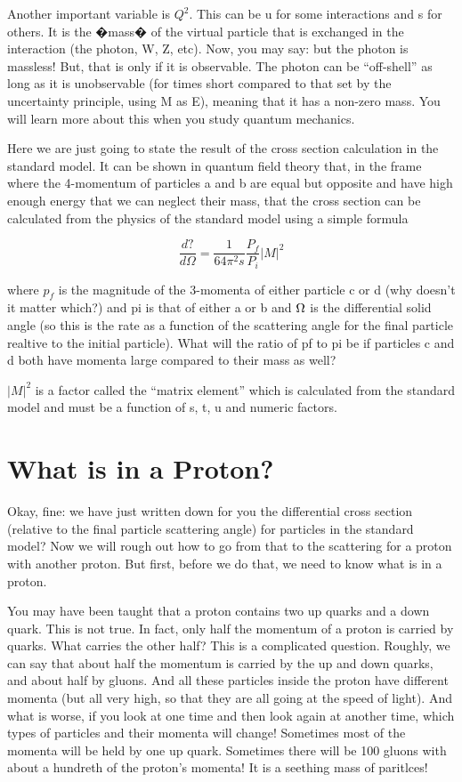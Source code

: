 Another important variable is \(Q^{2}\).  This can be u for some interactions and s for others.  It is the �mass� of the virtual particle that is exchanged in the interaction (the photon, W, Z, etc).  
Now, you may say: but the photon is massless!  But, that is only if it is observable.  The photon can be ``off-shell'' as long as it is unobservable (for times short compared to that set by the uncertainty principle, using M as E), meaning that it has a non-zero mass.  You will learn more about this when you study quantum mechanics.

Here we are just going to state the result of the cross section calculation in the standard model.
It can be shown in quantum field theory that, in the frame where the 4-momentum of particles a and b are equal but opposite and have high enough energy that we can neglect their mass, that the cross section can be calculated from the physics of the standard model using a simple formula

\begin{equation}
\frac{d?}{d\Omega} = \frac{1}{64\pi^{2}s}\frac{P_{f}}{P_{i}}|M|^{2}
\end{equation}

where \(p_{f}\) is the magnitude of the 3-momenta of either particle c or d (why doesn't it matter which?) and pi is that of either a or b and ${\rm \Omega}$ is the differential solid angle (so this is the rate as a function of the scattering angle for the final particle realtive to the initial particle). 
What will the ratio of pf to pi be if particles c and d both have momenta large compared to their mass as well?

\(|M|^{2}\)  is a factor called the ``matrix element'' which is calculated from the standard model and must be a function of s, t, u and numeric factors.



\section{What is in a Proton?}
Okay, fine: we have just written down for you the differential cross section (relative to the final particle scattering angle) for particles in the standard model?  Now we will rough out how to go from that to the scattering for a proton with another proton.  But first, before we do that, we need to know what is in a proton.


You may have been taught that a proton contains two up quarks and a down quark.  This is not true.  In fact, only half the momentum of a proton is carried by quarks.  What carries the other half?  This is a complicated question.  Roughly, we can say that about half the momentum is carried by the up and down quarks, and about half by gluons.  And all these particles inside the proton have different momenta (but all very high, so that they are all going at the speed of light).  And what is worse, if you look at one time and then look again at another time, which types of particles and their momenta will change!  Sometimes most of the momenta will be held by one up quark.  Sometimes there will be 100 gluons with about a hundreth of the proton's momenta!  It is a seething mass of paritlces!


